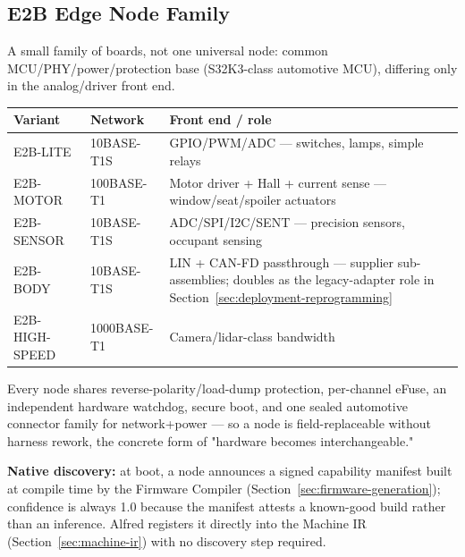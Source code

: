 \subsection{E2B Edge Node Family}
\label{sec:e2b-family}
A small family of boards, not one universal node: common MCU/PHY/power/protection base (S32K3-class automotive MCU), differing only in the analog/driver front end.

\begin{center}
\small
\begin{tabularx}{\linewidth}{@{}l l X@{}}
\toprule
\textbf{Variant} & \textbf{Network} & \textbf{Front end / role} \\
\midrule
E2B-LITE & 10BASE-T1S & GPIO/PWM/ADC --- switches, lamps, simple relays \\
E2B-MOTOR & 100BASE-T1 & Motor driver + Hall + current sense --- window/seat/spoiler actuators \\
E2B-SENSOR & 10BASE-T1S & ADC/SPI/I2C/SENT --- precision sensors, occupant sensing \\
E2B-BODY & 10BASE-T1S & LIN + CAN-FD passthrough --- supplier sub-assemblies; doubles as the legacy-adapter role in Section~\ref{sec:deployment-reprogramming} \\
E2B-HIGH-SPEED & 1000BASE-T1 & Camera/lidar-class bandwidth \\
\bottomrule
\end{tabularx}
\end{center}

Every node shares reverse-polarity/load-dump protection, per-channel eFuse, an independent hardware watchdog, secure boot, and one sealed automotive connector family for network+power --- so a node is field-replaceable without harness rework, the concrete form of "hardware becomes interchangeable."

\textbf{Native discovery:} at boot, a node announces a signed capability manifest built at compile time by the Firmware Compiler (Section~\ref{sec:firmware-generation}); confidence is always 1.0 because the manifest attests a known-good build rather than an inference. Alfred registers it directly into the Machine IR (Section~\ref{sec:machine-ir}) with no discovery step required.
